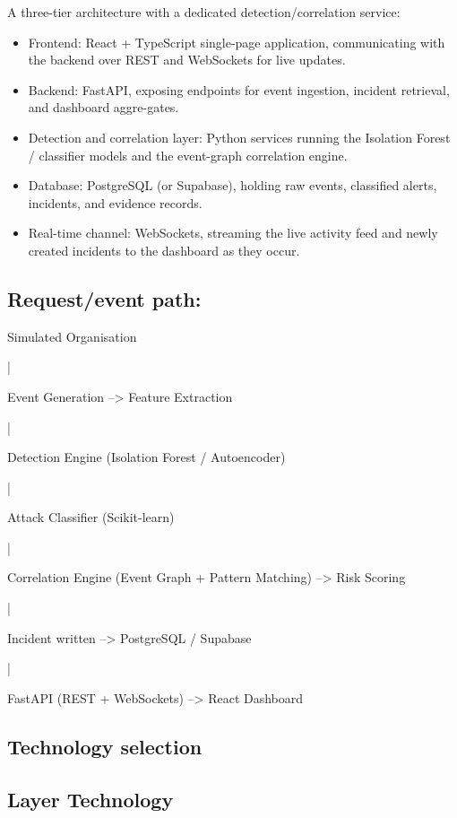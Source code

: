\documentclass[12pt]{article}
\begin{document}
A three-tier architecture with a dedicated detection/correlation service:

\begin{itemize}
  \item Frontend: React + TypeScript single-page application, communicating with the backend over REST and WebSockets for live updates.
  \item Backend: FastAPI, exposing endpoints for event ingestion, incident retrieval, and dashboard aggre-gates.
  \item Detection and correlation layer: Python services running the Isolation Forest / classifier models and the event-graph correlation engine.
  \item Database: PostgreSQL (or Supabase), holding raw events, classified alerts, incidents, and evidence records.
  \item Real-time channel: WebSockets, streaming the live activity feed and newly created incidents to the dashboard as they occur.
\end{itemize}

\subsection{Request/event path:}

Simulated Organisation

|

Event Generation --> Feature Extraction

|

Detection Engine (Isolation Forest / Autoencoder)

|

Attack Classifier (Scikit-learn)

|

Correlation Engine (Event Graph + Pattern Matching) --> Risk Scoring

|

Incident written --> PostgreSQL / Supabase

|

FastAPI (REST + WebSockets) --> React Dashboard

\subsection{Technology selection}

\subsection{Layer Technology}
\end{document}
